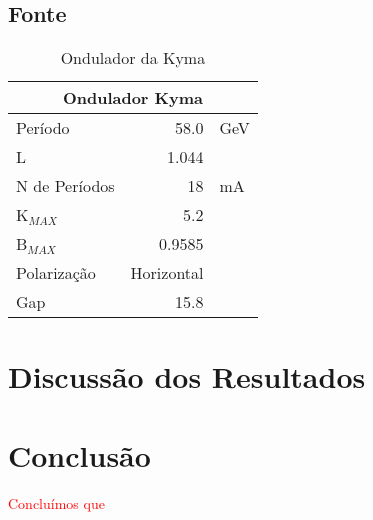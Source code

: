 \documentclass[
	12pt,				%
	openany,			%
	oneside,			%
	a4paper,			%
	english,			%
	french,				%
	spanish,			%
	brazil,				%
	sumario=tradicional]{abntex2}
\begin{document}
\section{Fonte}
\lipsum[24]

\begin{table}[H]
\centering
\ABNTEXfontereduzida
\caption{Ondulador da Kyma}
\label{tab:Kyma_parameters}
\begin{tabular}{@{}lrl@{}}
\toprule
\multicolumn{3}{c}{Ondulador Kyma}     \\ 
\midrule
Período         & 58.0   & GeV \\
L               & 1.044  &     \\
N de Períodos   & 18     & mA  \\ 
K$_{MAX}$         & 5.2    &     \\
B$_{MAX}$         & 0.9585 &     \\
Polarização     & Horizontal  &     \\
Gap             & 15.8   &     \\ \bottomrule
\end{tabular}
\end{table}


\chapter{Discussão dos Resultados}
\lipsum[24]



\chapter{Conclusão}
\textcolor{red}{Concluímos que \lipsum[30]}

%

\postextual


\end{document}
